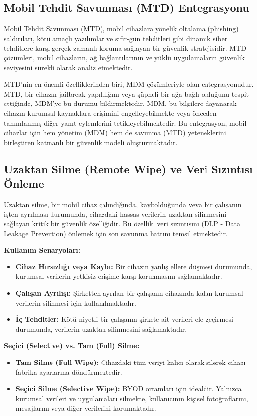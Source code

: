 \subsection{Mobil Tehdit Savunması (MTD) Entegrasyonu}

Mobil Tehdit Savunması (MTD), mobil cihazlara yönelik oltalama (phishing) saldırıları, kötü amaçlı yazılımlar ve sıfır-gün tehditleri gibi dinamik siber tehditlere karşı gerçek zamanlı koruma sağlayan bir güvenlik stratejisidir. MTD çözümleri, mobil cihazların, ağ bağlantılarının ve yüklü uygulamaların güvenlik seviyesini sürekli olarak analiz etmektedir.

MTD'nin en önemli özelliklerinden biri, MDM çözümleriyle olan entegrasyonudur. MTD, bir cihazın jailbreak yapıldığını veya şüpheli bir ağa bağlı olduğunu tespit ettiğinde, MDM'ye bu durumu bildirmektedir. MDM, bu bilgilere dayanarak cihazın kurumsal kaynaklara erişimini engelleyebilmekte veya önceden tanımlanmış diğer yanıt eylemlerini tetikleyebilmektedir. Bu entegrasyon, mobil cihazlar için hem yönetim (MDM) hem de savunma (MTD) yeteneklerini birleştiren katmanlı bir güvenlik modeli oluşturmaktadır.

\subsection{Uzaktan Silme (Remote Wipe) ve Veri Sızıntısı Önleme}

Uzaktan silme, bir mobil cihaz çalındığında, kaybolduğunda veya bir çalışanın işten ayrılması durumunda, cihazdaki hassas verilerin uzaktan silinmesini sağlayan kritik bir güvenlik özelliğidir. Bu özellik, veri sızıntısını (DLP - Data Leakage Prevention) önlemek için son savunma hattını temsil etmektedir.

\textbf{Kullanım Senaryoları:}
\begin{itemize}
    \item \textbf{Cihaz Hırsızlığı veya Kaybı:} Bir cihazın yanlış ellere düşmesi durumunda, kurumsal verilerin yetkisiz erişime karşı korunmasını sağlamaktadır.
    \item \textbf{Çalışan Ayrılışı:} Şirketten ayrılan bir çalışanın cihazında kalan kurumsal verilerin silinmesi için kullanılmaktadır.
    \item \textbf{İç Tehditler:} Kötü niyetli bir çalışanın şirkete ait verileri ele geçirmesi durumunda, verilerin uzaktan silinmesini sağlamaktadır.
\end{itemize}

\textbf{Seçici (Selective) vs. Tam (Full) Silme:}
\begin{itemize}
    \item \textbf{Tam Silme (Full Wipe):} Cihazdaki tüm veriyi kalıcı olarak silerek cihazı fabrika ayarlarına döndürmektedir.
    \item \textbf{Seçici Silme (Selective Wipe):} BYOD ortamları için idealdir. Yalnızca kurumsal verileri ve uygulamaları silmekte, kullanıcının kişisel fotoğraflarını, mesajlarını veya diğer verilerini korumaktadır.
\end{itemize}

